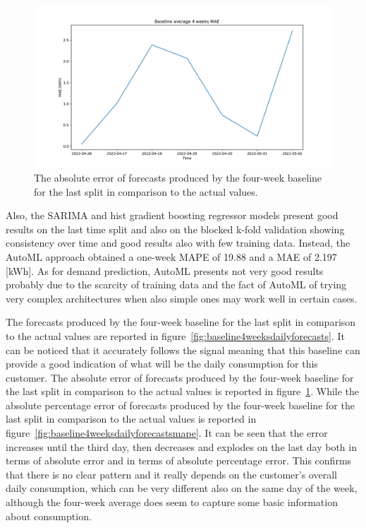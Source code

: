 \begin{figure}[H]
\centering
\includegraphics[width=1\textwidth]{images/baseline/baseline_average_4_weeks_daily_aggregated_mae}
\caption{The absolute error of forecasts produced by the four-week baseline for the last split in comparison to the actual values.}
\label{fig:baseline4weeksdailyforecastsmae}
\end{figure}

Also, the SARIMA and hist gradient boosting regressor models present good results on the last time split and also on the blocked k-fold validation showing consistency over time and good results also with few training data.
Instead, the AutoML approach obtained a one-week MAPE of 19.88 and a MAE of 2.197 [kWh].
As for demand prediction, AutoML presents not very good results probably due to the scarcity of training data and the fact of AutoML of trying very complex architectures when also simple ones may work well in certain cases.

The forecasts produced by the four-week baseline for the last split in comparison to the actual values are reported in figure~\ref{fig:baseline4weeksdailyforecasts}.
It can be noticed that it accurately follows the signal meaning that this baseline can provide a good indication of what will be the daily consumption for this customer.
The absolute error of forecasts produced by the four-week baseline for the last split in comparison to the actual values is reported in figure~\ref{fig:baseline4weeksdailyforecastsmae}.
While the absolute percentage error of forecasts produced by the four-week baseline for the last split in comparison to the actual values is reported in figure~\ref{fig:baseline4weeksdailyforecastsmape}.
It can be seen that the error increases until the third day, then decreases and explodes on the last day both in terms of absolute error and in terms of absolute percentage error.
This confirms that there is no clear pattern and it really depends on the customer's overall daily consumption, which can be very different also on the same day of the week, although the four-week average does seem to capture some basic information about consumption.

